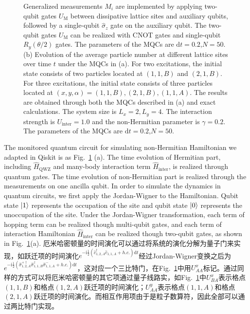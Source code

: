 \documentclass[longbibliography, aps, prx, amsmath, amssymb, amsfonts, twocolumn,superscriptaddress, footinbib]{revtex4-1}
\begin{document}
\begin{figure}[htbp]
{		Generalized measurements $M_i$ are implemented by applying two-qubit gates $U_{\text{M}}$ between dissipative lattice sites and auxiliary qubits, followed by a single-qubit $\hat{\sigma}_z$ gate on the auxiliary qubit.
		The two-qubit gates $U_{\text{M}}$ can be realized with CNOT gates and single-qubit $R_y(\theta/2)$ gates. The parameters of the MQCs are $\mathrm{d}t=0.2$,$N=50$.
		(b) Evolution of the average particle number at different lattice sites over time $t$ under the MQCs in (a). 
		For two excitations, the initial state consists of two particles located at $(1,1,B)$ and $(2,1,B)$. For three excitations, the initial state consists of three particles located at $(x,y,\alpha)=(1,1,B), (2,1,B), (1,1,A)$.
		The results are obtained through both the MQCs described in (a) and exact calculations. The system size is $L_x=2,L_y=4$. The interaction strength is $U_{\text{inter}}=1.0$ and the non-Hermitian parameter is $\gamma=0.2$. The parameters of the MQCs are $\mathrm{d}t=0.2$,$N=50$.
		}
		\label{fig:04}
	\end{figure}
	The monitored quantum circuit for simulating non-Hermitian Hamiltonian we adapted in Qiskit is as Fig.~\ref{fig:04} (a). The time evolution of Hermitian part, including $\hat{H}_{\text{QWZ}}$ and many-body interaction term $\hat{H}_{\text{inter}}$, is realized through quantum gates. The time evolution of non-Hermitian part is realized through the measurements on one ancilla qubit. 
	In order to simulate the dynamics in quantum circuits, we first apply the Jordan-Wigner to the Hamiltonian. Qubit state $\ket{1}$ represents the occupation of the site and qubit state $\ket{0}$ represents the unoccupation of the site. 
	Under the Jordan-Wigner transformation, each term of hopping term can be realized though multi-qubit gates, and each term of interaction Hamiltonian $\hat{H}_{\text{inter}}$ can be realized though two-qubit gates, as shown in Fig.~\ref{fig:04}(a). 
	厄米哈密顿量的时间演化可以通过将系统的演化分解为量子门来实现，如跃迁项的时间演化$e^{-\mathrm{i} \frac{1}{2} (\hat{c}_{1,2,A}^{\dagger} \hat{c}_{1,1,A} +h.c.)\mathrm{d} t}$经过Jordan-Wigner变换之后为$e^{-\mathrm{i} \frac{1}{2} (\hat{\sigma}_{1,2,A}^{+\dagger} \hat{\sigma}^z_{1,1,B}\hat{\sigma}_{1,1,A}^{-} +h.c.)\mathrm{d} t}$，这对应一个三比特门，在Fig.~\ref{fig:04}中用$U_{AA}^x$标记。通过同样的方式可以将厄米哈密顿量的其它项通过量子线路实，如Fig.~\ref{fig:04}中$U_{BA}^x$表示格点$(1,1,B)$和格点$(1,2,A)$跃迁项的时间演化；$U_{AA}^y$表示格点$(1,1,A)$和格点$(2,1,A)$跃迁项的时间演化。而相互作用项由于是粒子数算符，因此全部可以通过两比特门实现。
\end{document}
